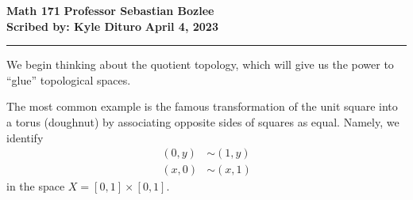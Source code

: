 \documentclass[12pt, twosided]{article}
\begin{document}
\noindent \textbf{Math 171} \hfill \textbf{Professor Sebastian Bozlee} \\
\textbf{Scribed by: Kyle Dituro} \hfill \textbf{April 4, 2023}\hrule
\vspace{.2in}

We begin thinking about the quotient topology, which will give us the power to ``glue'' topological spaces.

The most common example is the famous transformation of the unit square into a torus (doughnut) by associating opposite sides of squares as equal. Namely, we identify
\begin{align*}
  (0, y) &\sim (1, y) \\
  (x, 0) &\sim (x, 1)
\end{align*}
in the space \(X = [0, 1] \times [0, 1]\).
\end{document}

